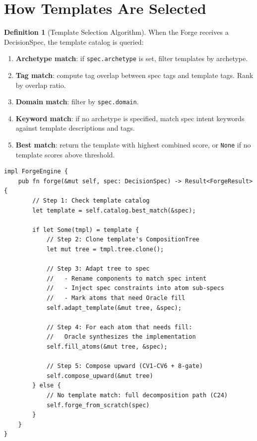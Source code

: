 \documentclass[11pt,a4paper,twoside]{article}
\theoremstyle{definition}
\newtheorem{definition}{Definition}[section]
\theoremstyle{plain}
\theoremstyle{remark}
\begin{document}
\section{How Templates Are Selected}\label{sec:select}

\begin{definition}[Template Selection Algorithm]\label{def:select}
When the Forge receives a DecisionSpec, the template catalog is
queried:
\begin{enumerate}[nosep]
  \item \textbf{Archetype match}: if \texttt{spec.archetype} is
        set, filter templates by archetype.
  \item \textbf{Tag match}: compute tag overlap between spec tags
        and template tags. Rank by overlap ratio.
  \item \textbf{Domain match}: filter by \texttt{spec.domain}.
  \item \textbf{Keyword match}: if no archetype is specified, match
        spec intent keywords against template descriptions and tags.
  \item \textbf{Best match}: return the template with highest
        combined score, or \texttt{None} if no template scores
        above threshold.
\end{enumerate}
\end{definition}

\begin{lstlisting}[title={Template Matching in ForgeEngine}]
impl ForgeEngine {
    pub fn forge(&mut self, spec: DecisionSpec) -> Result<ForgeResult> {
        // Step 1: Check template catalog
        let template = self.catalog.best_match(&spec);

        if let Some(tmpl) = template {
            // Step 2: Clone template's CompositionTree
            let mut tree = tmpl.tree.clone();

            // Step 3: Adapt tree to spec
            //   - Rename components to match spec intent
            //   - Inject spec constraints into atom sub-specs
            //   - Mark atoms that need Oracle fill
            self.adapt_template(&mut tree, &spec);

            // Step 4: For each atom that needs fill:
            //   Oracle synthesizes the implementation
            self.fill_atoms(&mut tree, &spec);

            // Step 5: Compose upward (CV1-CV6 + 8-gate)
            self.compose_upward(&mut tree)
        } else {
            // No template match: full decomposition path (C24)
            self.forge_from_scratch(spec)
        }
    }
}
\end{lstlisting}
\end{document}
